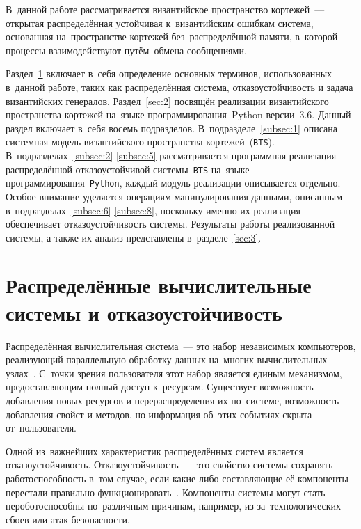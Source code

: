 В~данной работе рассматривается византийское пространство кортежей~--- открытая распределённая устойчивая к~византийским ошибкам система, основанная на~пространстве кортежей без~распределённой памяти, в~которой процессы взаимодействуют путём~обмена сообщениями.

Раздел~\ref{sec:1} включает в~себя определение основных терминов, использованных в~данной работе, таких как распределённая система, отказоустойчивость и задача византийских генералов. Раздел~\ref{sec:2} посвящён реализации византийского пространства кортежей на~языке программирования~Python версии~3.6. Данный раздел включает в~себя восемь подразделов. В~подразделе~\ref{subsec:1} описана системная модель византийского пространства кортежей~(\texttt{BTS}). В~подразделах~\ref{subsec:2}-\ref{subsec:5} рассматривается программная реализация распределённой отказоустойчивой системы~\texttt{BTS} на~языке программирования~\texttt{Python}, каждый модуль реализации описывается отдельно. Особое внимание уделяется операциям манипулирования данными, описанным в~подразделах~\ref{subsec:6}-\ref{subsec:8}, поскольку именно их реализация обеспечивает отказоустойчивость системы. Результаты работы реализованной системы, а также их анализ представлены в~разделе~\ref{sec:3}.

\pagebreak


\section{Распределённые вычислительные системы и отказоустойчивость}\label{sec:1}
Распределённая вычислительная система~--- это набор независимых компьютеров, реализующий параллельную обработку данных на~многих вычислительных узлах~\autocite{Tanenbaum}. С~точки зрения пользователя этот набор является единым механизмом, предоставляющим полный доступ к~ресурсам. Существует возможность добавления новых ресурсов и перераспределения их по~системе, возможность добавления свойст и методов, но информация об~этих событиях скрыта от~пользователя.

Одной из~важнейших характеристик распределённых систем является отказоустойчивость. Отказоустойчивость~--- это свойство системы сохранять работоспособность в~том случае, если какие-либо составляющие её компоненты перестали правильно функционировать~\autocite{Tanenbaum}. Компоненты системы могут стать нероботоспособны по~различным причинам, например, из-за~технологических сбоев или атак безопасности.

